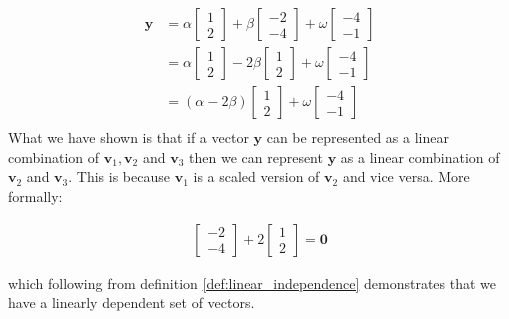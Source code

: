 \documentclass[a4paper,12pt]{article}
\newcommand{\vectr}[1]{\textbf{#1}}
\begin{document}
	\begin{align}
		\vectr{y} &= \alpha \begin{bmatrix} 1 \\ 2 \end{bmatrix} + \beta \begin{bmatrix} -2 \\ -4 \end{bmatrix} + \omega \begin{bmatrix} -4 \\ -1 \end{bmatrix} \\
		&= \alpha \begin{bmatrix} 1 \\ 2 \end{bmatrix} - 2\beta \begin{bmatrix} 1 \\ 2 \end{bmatrix} + \omega \begin{bmatrix} -4 \\ -1 \end{bmatrix} \\
		&= (\alpha - 2\beta) \begin{bmatrix} 1 \\ 2 \end{bmatrix} + \omega \begin{bmatrix} -4 \\ -1 \end{bmatrix} \\
	\end{align} 
	What we have shown is that if a vector $ \vectr{y} $ can be represented as a linear combination of $ \vectr{v}_1,\vectr{v}_2 $ and $ \vectr{v}_3 $ then we can represent $ \vectr{y} $ as a linear combination of $ \vectr{v}_2 $ and $ \vectr{v}_3 $. This is because $ \vectr{v}_1 $ is a scaled version of $ \vectr{v}_2 $ and vice versa. 
	More formally:
	
	\begin{align}
		\begin{bmatrix} -2 \\ -4 \end{bmatrix} + 2 \begin{bmatrix} 1 \\ 2 \end{bmatrix} = \vectr{0}
	\end{align}
	
	which following from definition \ref{def:linear_independence} demonstrates that we have a linearly dependent set of vectors.
\end{document}
